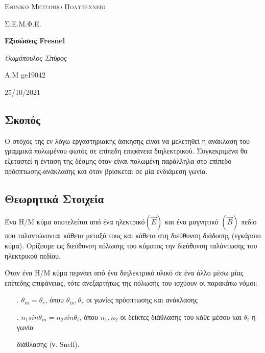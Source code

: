 \documentclass[a4paper]{article}
\begin{document}
\begin{titlepage}			%
	\centering
	{\scshape\LARGE Εθινικό Μετσόβιο Πολυτεχνείο\par}
	{\scshape \LARGE Σ.Ε.Μ.Φ.Ε.\par}
	\vspace{1cm}
	{\huge\bfseries Εξισώσεις Fresnel\par}
	\vspace{1cm}
	{\Large\itshape Θωμόπουλος Σπύρος\par}		%
	
	{\large A.M ge19042 \hfill \\}%
	\vspace{1cm}
	{\large 25/10/2021\par}
\end{titlepage}


\newpage 

\subsection*{Σκοπός}
Ο στόχος της εν λόγω εργαστηριακής άσκησης είναι να μελετηθεί η ανάκλαση του γραμμικά πολωμένου φωτός σε επίπεδη επιφάνεια διηλεκτρικού. Συγκεκριμένα θα εξεταστεί η ένταση της δέσμης όταν είναι πολωμένη παράλληλα στο επίπεδο πρόσπτωσης-ανάκλασης και όταν βρίσκεται σε μία ενδιάμεση γωνία.
\subsection*{Θεωρητικά Στοιχεία}
Ένα Η/Μ κύμα αποτελείται από ένα ηλεκτρικό$ (\vec{E})$ και ένα μαγνητικό $(\vec{B})$ πεδίο που ταλαντώνονται κάθετα μεταξύ τους και κάθετα στη διεύθυνση διάδοσης (εγκάρσιο κύμα). Ορίζουμε ως διεύθυνση πόλωσης του κύματος την διεύθυνση ταλάντωσης του ηλεκτρικού πεδίου.

Όταν ένα Η/Μ κύμα περνάει από ένα διηλεκτρικό υλικό σε ένα άλλο μέσω μίας επίπεδης επιφάνειας, τότε ανεξαρτήτως της πόλωσής του ισχύουν οι παρακάτω νόμοι: 


\begin{itemize}
\item[.] $\theta_{in} = \theta_r$,\hspace{1cm} όπου $\theta_{in}, \theta_r$ οι γωνίες πρόσπτωσης και ανάκλασης
\item[.] $n_1 sin\theta_{in} = n_2 sin\theta_t$,\hspace{0.3cm} όπου $n_1, n_2$ οι δείκτες διάθλασης του κάθε μέσου και $\theta_t$ η γωνία  

			\hspace{3.35cm} διάθλασης (ν. Snell).
\end{itemize}
\end{document}
